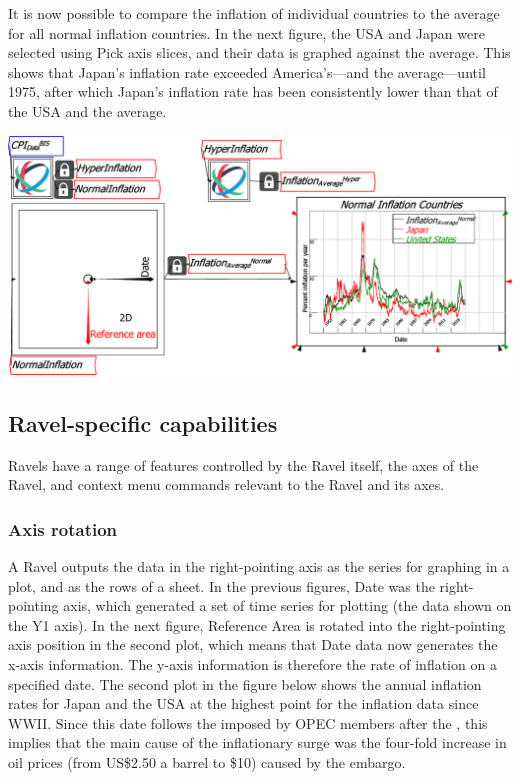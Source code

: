 It is now possible to compare the inflation of individual countries
to the average for all normal inflation countries. In the next figure,
the USA and Japan were selected using Pick axis slices, and their
data is graphed against the average. This shows that Japan's inflation
rate exceeded America's---and the average---until 1975, after which
Japan's inflation rate has been consistently lower than that of the
USA and the average.

\includegraphics[width=15cm]{images/CPI_SubsetsAverageVsSelection}

\subsection{Ravel-specific capabilities}

Ravels have a range of features controlled by the Ravel itself, the
axes of the Ravel, and context menu commands relevant to the Ravel
and its axes.

\subsubsection{Axis rotation}

A Ravel outputs the data in the right-pointing axis as the series
for graphing in a plot, and as the rows of a sheet. In the previous
figures, Date was the right-pointing axis, which generated a set of
time series for plotting (the data shown on the Y1 axis). In the next
figure, Reference Area is rotated into the right-pointing axis position
in the second plot, which means that Date data now generates the x-axis
information. The y-axis information is therefore the rate of inflation
on a specified date. The second plot in the figure below shows the
annual inflation rates for Japan and the USA at the highest point
for the inflation data since WWII. Since this date follows the  imposed
by OPEC members after the ,
this implies that the main cause of the inflationary surge was the
four-fold increase in oil prices (from US\$2.50 a
barrel to \$10) caused by the embargo.

